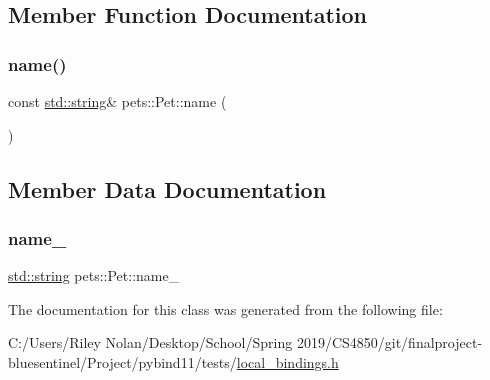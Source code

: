 \subsection{Member Function Documentation}
\mbox{\label{classpets_1_1_pet_ac3c9624914d359e198368489273ad629}} 
\subsubsection{\texorpdfstring{name()}{name()}}
{\footnotesize\ttfamily const \mbox{\hyperlink{_s_d_l__opengl__glext_8h_ab4ccfaa8ab0e1afaae94dc96ef52dde1}{std\+::string}}\& pets\+::\+Pet\+::name (\begin{DoxyParamCaption}{ }\end{DoxyParamCaption})\hspace{0.3cm}{\ttfamily [inline]}}



\subsection{Member Data Documentation}
\mbox{\label{classpets_1_1_pet_ae5efab5a6ec6b610b8d807a36bb6c3a9}} 
\subsubsection{\texorpdfstring{name\_}{name\_}}
{\footnotesize\ttfamily \mbox{\hyperlink{_s_d_l__opengl__glext_8h_ab4ccfaa8ab0e1afaae94dc96ef52dde1}{std\+::string}} pets\+::\+Pet\+::name\+\_\+}



The documentation for this class was generated from the following file\+:\begin{DoxyCompactItemize}
\item 
C\+:/\+Users/\+Riley Nolan/\+Desktop/\+School/\+Spring 2019/\+C\+S4850/git/finalproject-\/bluesentinel/\+Project/pybind11/tests/\mbox{\hyperlink{local__bindings_8h}{local\+\_\+bindings.\+h}}\end{DoxyCompactItemize}
